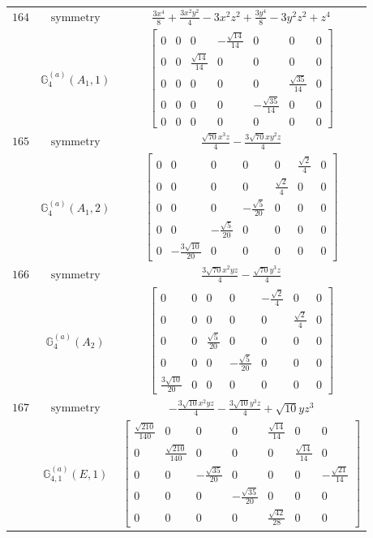 \documentclass[fleqn,8pt,landscape]{jsarticle}
\begin{document}
\begin{longtable}{ccc}
$ 164 $ & $ \text{symmetry} $ & $ \frac{3 x^{4}}{8} + \frac{3 x^{2} y^{2}}{4} - 3 x^{2} z^{2} + \frac{3 y^{4}}{8} - 3 y^{2} z^{2} + z^{4} $ \\
$  $ & $ \mathbb{G}_{4}^{(a)}(A_{1},1) $ & $ \begin{bmatrix} 0 & 0 & 0 & - \frac{\sqrt{14}}{14} & 0 & 0 & 0 \\ 0 & 0 & \frac{\sqrt{14}}{14} & 0 & 0 & 0 & 0 \\ 0 & 0 & 0 & 0 & 0 & \frac{\sqrt{35}}{14} & 0 \\ 0 & 0 & 0 & 0 & - \frac{\sqrt{35}}{14} & 0 & 0 \\ 0 & 0 & 0 & 0 & 0 & 0 & 0 \end{bmatrix} $ \\ \hline
$ 165 $ & $ \text{symmetry} $ & $ \frac{\sqrt{70} x^{3} z}{4} - \frac{3 \sqrt{70} x y^{2} z}{4} $ \\
$  $ & $ \mathbb{G}_{4}^{(a)}(A_{1},2) $ & $ \begin{bmatrix} 0 & 0 & 0 & 0 & 0 & \frac{\sqrt{2}}{4} & 0 \\ 0 & 0 & 0 & 0 & \frac{\sqrt{2}}{4} & 0 & 0 \\ 0 & 0 & 0 & - \frac{\sqrt{5}}{20} & 0 & 0 & 0 \\ 0 & 0 & - \frac{\sqrt{5}}{20} & 0 & 0 & 0 & 0 \\ 0 & - \frac{3 \sqrt{10}}{20} & 0 & 0 & 0 & 0 & 0 \end{bmatrix} $ \\ \hline
$ 166 $ & $ \text{symmetry} $ & $ \frac{3 \sqrt{70} x^{2} y z}{4} - \frac{\sqrt{70} y^{3} z}{4} $ \\
$  $ & $ \mathbb{G}_{4}^{(a)}(A_{2}) $ & $ \begin{bmatrix} 0 & 0 & 0 & 0 & - \frac{\sqrt{2}}{4} & 0 & 0 \\ 0 & 0 & 0 & 0 & 0 & \frac{\sqrt{2}}{4} & 0 \\ 0 & 0 & \frac{\sqrt{5}}{20} & 0 & 0 & 0 & 0 \\ 0 & 0 & 0 & - \frac{\sqrt{5}}{20} & 0 & 0 & 0 \\ \frac{3 \sqrt{10}}{20} & 0 & 0 & 0 & 0 & 0 & 0 \end{bmatrix} $ \\ \hline
$ 167 $ & $ \text{symmetry} $ & $ - \frac{3 \sqrt{10} x^{2} y z}{4} - \frac{3 \sqrt{10} y^{3} z}{4} + \sqrt{10} y z^{3} $ \\
$  $ & $ \mathbb{G}_{4,1}^{(a)}(E,1) $ & $ \begin{bmatrix} \frac{\sqrt{210}}{140} & 0 & 0 & 0 & \frac{\sqrt{14}}{14} & 0 & 0 \\ 0 & \frac{\sqrt{210}}{140} & 0 & 0 & 0 & \frac{\sqrt{14}}{14} & 0 \\ 0 & 0 & - \frac{\sqrt{35}}{20} & 0 & 0 & 0 & - \frac{\sqrt{21}}{14} \\ 0 & 0 & 0 & - \frac{\sqrt{35}}{20} & 0 & 0 & 0 \\ 0 & 0 & 0 & 0 & \frac{\sqrt{42}}{28} & 0 & 0 \end{bmatrix} $ \\ \hline

\end{longtable}
\end{document}
